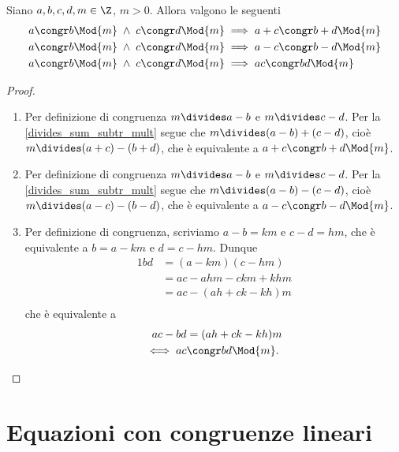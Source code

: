 \begin{proposition}
    Siano $a, b, c, d, m \in \Z$, $m > 0$. Allora valgono le seguenti
    \begin{align}
        &a \congr b \Mod{m} \;\land\; c \congr d \Mod{m}\implies a+c \congr b+d\Mod{m} \label{somma_congrui}\\
        &a \congr b \Mod{m} \;\land\; c \congr d \Mod{m}\implies a-c \congr b-d\Mod{m} \label{differenza_congrui}\\
        &a \congr b \Mod{m} \;\land\; c \congr d \Mod{m}\implies ac \congr bd\Mod{m} \label{prodotto_congrui}
    \end{align}
\end{proposition}
\begin{proof}
    \begin{enumerate}
        \item Per definizione di congruenza $m \divides a - b$ e $m \divides c - d$. Per la \autoref{divides_sum_subtr_mult} segue che $m \divides (a - b) + (c - d)$, cioè $m \divides (a + c) - (b + d)$, che è equivalente a $a+c \congr b+d\Mod{m}$.
        \item Per definizione di congruenza $m \divides a - b$ e $m \divides c - d$. Per la \autoref{divides_sum_subtr_mult} segue che $m \divides (a - b) - (c - d)$, cioè $m \divides (a - c) - (b - d)$, che è equivalente a $a-c \congr b-d\Mod{m}$.
        \item Per definizione di congruenza, scriviamo $a - b = km$ e $c - d = hm$, che è equivalente a $b = a - km$ e $d = c - hm$. Dunque
        \begin{alignat*}
            {1}
            bd &= (a - km)(c - hm) \\
                &= ac - ahm - c km + khm \\
                &= ac - (ah + c k - kh)m \\
        \end{alignat*}    
        che è equivalente a
        \begin{alignat*} {1}
            ac - bd &= (ah + c k - kh)m \\
            \iff ac &\congr bd \Mod{m}.
        \end{alignat*} \qedhere
    \end{enumerate}
\end{proof}

\section{Equazioni con congruenze lineari}

